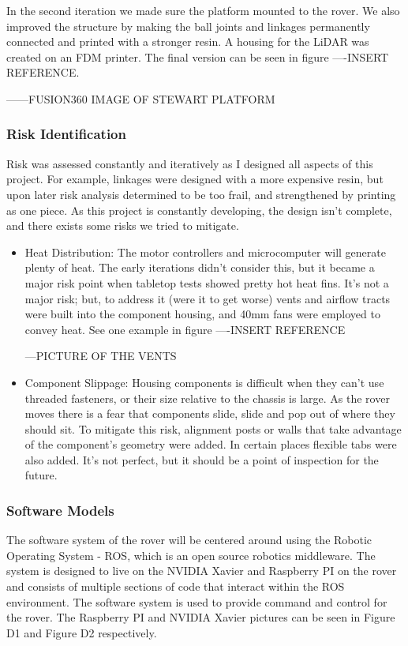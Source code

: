 \documentclass[a4paper, 10pt]{article}
\begin{document}
 		In the second iteration we made sure the platform mounted to the rover. We also improved the structure by making the ball joints and linkages permanently connected and printed with a stronger resin. A housing for the LiDAR was created on an FDM printer. The final version can be seen in figure ----INSERT REFERENCE.
 		
 		------FUSION360 IMAGE OF STEWART PLATFORM
 		
		\subsubsection*{Risk Identification}
		Risk was assessed constantly and iteratively as I designed all aspects of this project. For example, linkages were designed with a more expensive resin, but upon later risk analysis determined to be too frail, and strengthened by printing as one piece. As this project is constantly developing, the design isn't complete, and there exists some risks we tried to mitigate.
			
			\begin{itemize}
				\item{Heat Distribution:}
				The motor controllers and microcomputer will generate plenty of heat. The early iterations didn't consider this, but it became a major risk point when tabletop tests showed pretty hot heat fins. It's not a major risk; but, to address it (were it to get worse) vents and airflow tracts were built into the component housing, and 40mm fans were employed to convey heat. See one example in figure ----INSERT REFERENCE
				
				---PICTURE OF  THE VENTS
				
				\item{Component Slippage:}
				Housing components is difficult when they can't use threaded fasteners, or their size relative to the chassis is large. As the rover moves there is a fear that components slide, slide and pop out of where they should sit. To mitigate this risk, alignment posts or walls that take advantage of the component's geometry were added. In certain places flexible tabs were also added. It's not perfect, but it should be a point of inspection for the future.
			\end{itemize}			 		
 		
 		\subsubsection{Software Models}
 		The software system of the rover will be centered around using the Robotic Operating System - ROS, which is an open source robotics middleware. The system is designed to live on the NVIDIA Xavier and Raspberry PI on the rover and consists of multiple sections of code that interact within the ROS environment. The software system is used to provide command and control for the rover. The Raspberry PI and NVIDIA Xavier pictures can be seen in Figure D1 and Figure D2 respectively. 
\end{document}

